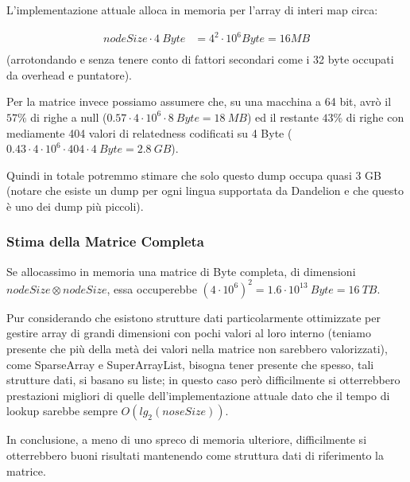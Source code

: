 L'implementazione attuale alloca in memoria per l'array di interi map circa:
\begin{center}
\begin{equation}\begin{split} 
    nodeSize \cdot 4\ Byte & = 4^2 \cdot 10^6 Byte = 16 MB \\
\end{split}\end{equation}
(arrotondando e senza tenere conto di fattori secondari come i 32 byte occupati da overhead e puntatore).
\end{center}
Per la matrice invece possiamo assumere che, su una macchina a 64 bit, avrò il $57\%$ di righe a null ($0.57 \cdot 4\cdot 10^6 \cdot 8\ Byte = 18\ MB$) ed il 
restante $43\%$ di righe con mediamente 404 valori di relatedness codificati su 4 Byte ($0.43 \cdot 4 \cdot 10^6 \cdot 404 \cdot 4\ Byte = 2.8\ GB$). 

Quindi in totale potremmo stimare che solo questo dump occupa quasi 3 GB (notare che esiste un dump per ogni lingua supportata da Dandelion e che questo è uno 
dei dump più piccoli).

\subsubsection{Stima della Matrice Completa}
Se allocassimo in memoria una matrice di Byte completa, di dimensioni $nodeSize \otimes nodeSize$, essa occuperebbe $(4 \cdot 10^6)^2 = 1.6 \cdot 10^{13}\ Byte = 16\ TB$.

Pur considerando che esistono strutture dati particolarmente ottimizzate per gestire array di grandi dimensioni con pochi valori al loro interno (teniamo presente che
più della metà dei valori nella matrice non sarebbero valorizzati), come SparseArray e SuperArrayList, bisogna tener presente che spesso, tali strutture dati, 
si basano su liste; in questo caso però difficilmente si otterrebbero prestazioni migliori di quelle dell'implementazione attuale dato che il tempo di lookup 
sarebbe sempre $O(lg_2(noseSize))$. 

In conclusione, a meno di uno spreco di memoria ulteriore, difficilmente si otterrebbero buoni risultati mantenendo come struttura dati di riferimento la matrice. 

